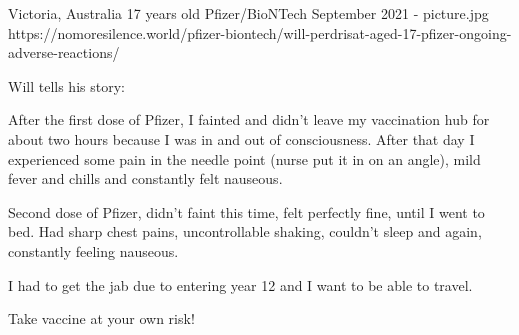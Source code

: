 {Victoria, Australia}
{17 years old}
{Pfizer/BioNTech}
{September 2021}
{-}
{picture.jpg}
{https://nomoresilence.world/pfizer-biontech/will-perdrisat-aged-17-pfizer-ongoing-adverse-reactions/}
{

Will tells his story:

After the first dose of Pfizer, I fainted and didn’t leave my vaccination hub for about two hours because I was in and out of consciousness. After that day I experienced some pain in the needle point (nurse put it in on an angle), mild fever and chills and constantly felt nauseous.

Second dose of Pfizer, didn’t faint this time, felt perfectly fine, until I went to bed. Had sharp chest pains, uncontrollable shaking, couldn’t sleep and again, constantly feeling nauseous.

I had to get the jab due to entering year 12 and I want to be able to travel.

Take vaccine at your own risk!

}
